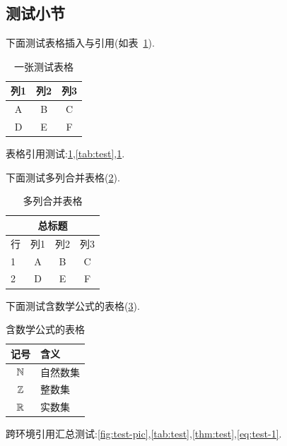 \subsection{测试小节}

下面测试表格插入与引用(如表~\ref{tab:test}).

\begin{table}[htbp]
    \centering
    \caption{一张测试表格}
    \label{tab:test}
    \begin{tabular}{ccc}
        \hline
        列1 & 列2 & 列3 \\
        \hline
        A & B & C \\
        D & E & F \\
        \hline
    \end{tabular}
\end{table}

表格引用测试:\ref{tab:test},\autoref{tab:test},\cref{tab:test}.

\medskip

下面测试多列合并表格(\ref{tab:multi}).

\begin{table}[htbp]
    \centering
    \caption{多列合并表格}
    \label{tab:multi}
    \begin{tabular}{lccc}
        \hline
        \multicolumn{4}{c}{总标题} \\
        \hline
        行 & 列1 & 列2 & 列3 \\
        \hline
        1 & A & B & C \\
        2 & D & E & F \\
        \hline
    \end{tabular}
\end{table}

\medskip

下面测试含数学公式的表格(\ref{tab:math}).

\begin{table}[htbp]
    \centering
    \caption{含数学公式的表格}
    \label{tab:math}
    \begin{tabular}{cl}
        \hline
        记号 & 含义 \\
        \hline
        $\mathbb{N}$ & 自然数集 \\
        $\mathbb{Z}$ & 整数集 \\
        $\mathbb{R}$ & 实数集 \\
        \hline
    \end{tabular}
\end{table}

跨环境引用汇总测试:\autoref{fig:test-pic},\autoref{tab:test},\autoref{thm:test},\eqref{eq:test-1}.
